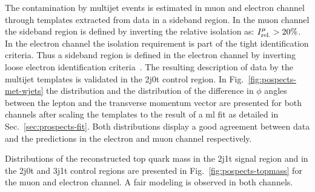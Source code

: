 

The contamination by multijet events is estimated in muon and electron channel through templates extracted from data in a sideband region. In the muon channel the sideband region is defined by inverting the relative isolation as: $\muiso>20\%$. In the electron channel the isolation requirement is part of the tight identification criteria. Thus a sideband region is defined in the electron channel by inverting loose electron identification criteria~\cite{CMS-DP-2017-004}. The resulting description of data by the multijet templates is validated in the 2j0t control region. In Fig.~\ref{fig:pospects-met-wjets} the \met distribution and the distribution of the difference in $\phi$ angles between the lepton and the transverse momentum vector are presented for both channels after scaling the templates to the result of a \gls{ml} fit as detailed in Sec.~\ref{sec:prospects-fit}. Both distributions display a good agreement between data and the predictions in the electron and muon channel respectively.

Distributions of the reconstructed top quark mass in the 2j1t signal region and in the 2j0t \wjets and 3j1t \ttbar control regions are presented in Fig.~\ref{fig:pospects-topmass} for the muon and electron channel. A fair modeling is observed in both channels.



